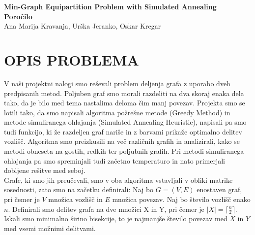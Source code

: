\documentclass[12pt,a4paper]{amsart}
\theoremstyle{definition} %
\theoremstyle{plain} %
\newcommand{\naslovdela}{Min-Graph Equipartition Problem with Simulated Annealing}
\newcommand{\letnica}{2019}
\begin{document}
\thispagestyle{empty}
\vfill

\begin{center}{\large
{\bf \naslovdela}\\[10mm]
{\bf Poročilo}\\[10mm]
Ana Marija Kravanja, Urška Jeranko, Oskar Kregar}\\[1cm]

\end{center}
\vfill

\noindent{\large
Ljubljana, \letnica}
\pagebreak

\tableofcontents

\pagebreak

\section{\textbf{OPIS PROBLEMA}}
V naši projektni nalogi smo reševali problem deljenja grafa z uporabo dveh predpisanih metod. Poljuben graf smo morali razdeliti na dva skoraj enaka dela tako, da je bilo med tema nastalima deloma čim manj povezav. Projekta smo se lotili tako, da smo napisali algoritma požrešne metode (Greedy Method) in metode simuliranega ohlajanja (Simulated Annealing Heuristic), napisali pa smo tudi funkcijo, ki že razdeljen graf nariše in z barvami prikaže optimalno delitev vozlišč. Algoritma smo preizkusili na več različnih grafih in analizirali, kako se metodi obneseta na gostih, redkih ter poljubnih grafih. Pri metodi simuliranega ohlajanja pa smo spreminjali tudi začetno temperaturo in nato primerjali dobljene rešitve med seboj. \\

Grafe, ki smo jih preučevali, smo v oba algoritma vstavljali v obliki matrike sosednosti, zato smo na začetku definirali: Naj bo $G=(V,E)$ enostaven graf, pri čemer je $V$ množica vozlišč in $E$ množica povezav. Naj bo število vozlišč enako $n$. Definirali smo delitev grafa na dve množici X in Y, pri čemer je $|X| = \lceil \frac{n}{2} \rceil$. Iskali smo minimalno širino bisekcije, to je najmanjše število povezav med $X$ in $Y$ med vsemi možnimi delitvami. \\
\end{document}
